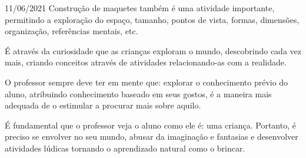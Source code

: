 \documentclass{SchoolBook}
\begin{document}
\begin{day}{11/06/2021}
         Construção de maquetes também é uma atividade importante, permitindo a exploração do espaço, tamanho, pontos de vista, formas, dimensões, organização, referências mentais, etc.
         
         É através da curiosidade que as crianças exploram o mundo, descobrindo cada vez mais, criando conceitos através de atividades relacionando-as com a realidade.
         
         O professor sempre deve ter em mente que: explorar o conhecimento prévio do aluno, atribuindo conhecimento baseado em seus gostos, é a maneira mais adequada de o estimular a procurar mais sobre aquilo.
         
         É fundamental que o professor veja o aluno como ele é: uma criança. Portanto, é preciso se envolver no seu mundo, abusar da imaginação e fantasias e desenvolver atividades lúdicas tornando o aprendizado natural como o brincar.
    \end{day}
\end{document}
